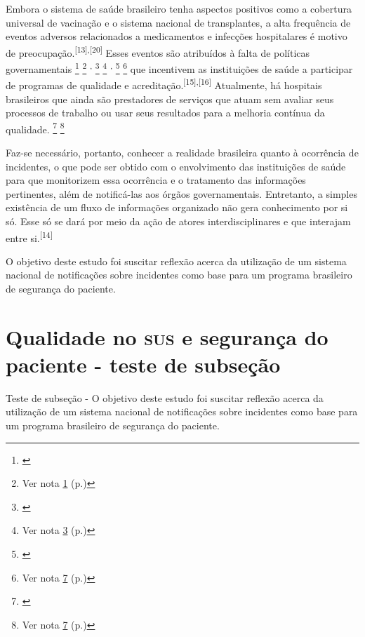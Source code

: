 \documentclass{article}
\newcounter{fn1}
\newcounter{fn2}
\newcounter{fn3}
\newcounter{fn4}
\newcounter{fn5}
\newcounter{fn6}
\newcounter{fn7}
\newcounter{fn8}
\begin{document}
Embora o sistema de saúde brasileiro tenha aspectos positivos como a cobertura
universal de
vacinação e o sistema nacional de transplantes, a alta frequência de eventos
adversos
relacionados a medicamentos e infecções hospitalares é motivo de preocupação.\textsuperscript{[}\textsuperscript{13}\textsuperscript{]}\textsuperscript{,}\textsuperscript{[}\textsuperscript{20}\textsuperscript{]}
Esses eventos são atribuídos à falta de políticas governamentais
%
		{\footnote{ \label{ftn:fn2}}}%
		{\footnote{Ver nota \ref{ftn:fn2} (p.\pageref{ftn:fn2})}}
			\textsuperscript{,}
%
		{\footnote{ \label{ftn:fn3}}}%
		{\footnote{Ver nota \ref{ftn:fn3} (p.\pageref{ftn:fn3})}}
			\textsuperscript{,}%
		{\footnote{ \label{ftn:fn4}}}%
		{\footnote{Ver nota \ref{ftn:fn4} (p.\pageref{ftn:fn4})}}
que incentivem as instituições de saúde a participar de programas de qualidade e
acreditação.\textsuperscript{[}\textsuperscript{15}\textsuperscript{]}\textsuperscript{,}\textsuperscript{[}\textsuperscript{16}\textsuperscript{]}
Atualmente, há hospitais brasileiros que ainda são prestadores de serviços que
atuam
sem avaliar seus processos de trabalho ou usar seus resultados para a melhoria
contínua da
qualidade.%
		{\footnote{ \label{ftn:fn4}}}%
		{\footnote{Ver nota \ref{ftn:fn4} (p.\pageref{ftn:fn4})}}

Faz-se necessário, portanto, conhecer a realidade brasileira quanto à ocorrência
de
incidentes, o que pode ser obtido com o envolvimento das instituições de saúde
para que
monitorizem essa ocorrência e o tratamento das informações pertinentes, além de
notificá-las
aos órgãos governamentais. Entretanto, a simples existência de um fluxo de
informações
organizado não gera conhecimento por si só. Esse só se dará por meio da ação de
atores
interdisciplinares e que interajam entre si.\textsuperscript{[}\textsuperscript{14}\textsuperscript{]}

O objetivo deste estudo foi suscitar reflexão acerca da utilização de um sistema
nacional
de notificações sobre incidentes como base para um programa brasileiro de
segurança do
paciente.
\section{Qualidade no \textsc{sus} e segurança do paciente - teste de subseção}

Teste de subseção - O objetivo deste estudo foi suscitar reflexão acerca da
utilização de um sistema nacional
de notificações sobre incidentes como base para um programa brasileiro de
segurança do
paciente.
\end{document}
